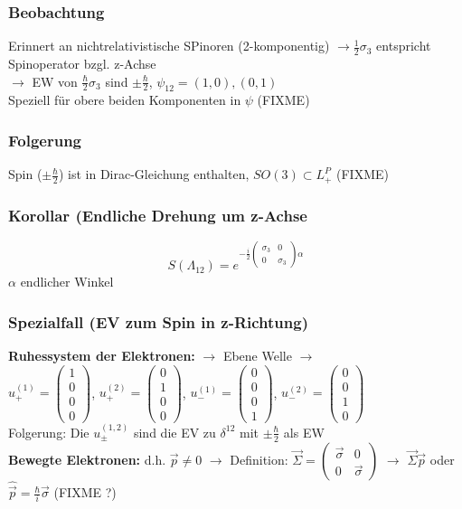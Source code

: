 \documentclass[twoside,a4paper]{scrartcl}
\renewcommand{\1}{\mathds{1}}
\newcommand{\ra}{\rightarrow}
\renewcommand{\L}{\Lambda}
\begin{document}
\subsubsection*{Beobachtung}
Erinnert an nichtrelativistische SPinoren (2-komponentig) $\ra \frac{1}{2}\sigma_3$ entspricht Spinoperator bzgl. z-Achse\\
$\ra$ EW von $\frac{\hbar}{2}\sigma_3$ sind $\pm \frac{\hbar}{2}$, $\psi_{12}=(1,0),(0,1)$\\
Speziell für obere beiden Komponenten in $\psi$ (FIXME)

\subsubsection*{Folgerung}
Spin ($\pm \frac{\hbar}{2}$) ist in Dirac-Gleichung enthalten, $SO(3) \subset L_+^P$ (FIXME)

\subsubsection*{Korollar (Endliche Drehung um z-Achse}
$$S(\L_{12})=e^{-\frac{i}{2}\begin{pmatrix}\sigma_3 & 0 \\ 0 & \sigma_3 \end{pmatrix}\alpha}$$
$\alpha$ endlicher Winkel

\subsubsection*{Spezialfall (EV zum Spin in z-Richtung)}
\textbf{Ruhessystem der Elektronen:} $\ra$ Ebene Welle $\ra$ \\
$u_+^{(1)}=\begin{pmatrix}1 \\ 0 \\ 0 \\ 0\end{pmatrix}$, $u_+^{(2)}=\begin{pmatrix}0 \\ 1 \\ 0 \\ 0\end{pmatrix}$, $u_-^{(1)}=\begin{pmatrix}0 \\ 0 \\ 0 \\1\end{pmatrix}$, $u_-^{(2)}=\begin{pmatrix}0 \\ 0 \\ 1 \\ 0\end{pmatrix}$\\
Folgerung: Die $u_\pm^{(1,2)}$ sind die EV zu $\delta^{12}$ mit $\pm \frac{\hbar}{2}$ als EW\\
\textbf{Bewegte Elektronen:}
d.h. $\vec p \neq 0$ $\ra$ Definition: $\vec \Sigma=\begin{pmatrix}\vec \sigma  & 0 \\ 0 & \vec \sigma \end{pmatrix}$ $\ra$ $\vec \Sigma \vec p$ oder $\hat {\vec p}=\frac{\hbar}{i}\vec \sigma$ (FIXME ?)
\end{document}
